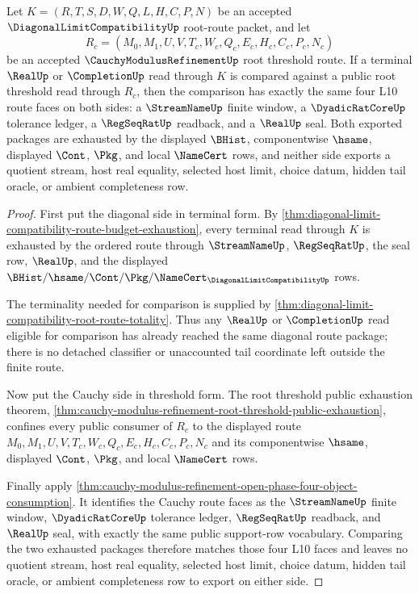 \begin{theorem}
\label{thm:diagonal-limit-compatibility-cauchy-refinement-threshold-correspondence}
Let $K=(R,T,S,D,W,Q,L,H,C,P,N)$ be an accepted $\DiagonalLimitCompatibilityUp$ root-route packet, and let
$$
R_c=(M_0,M_1,U,V,T_c,W_c,Q_c,E_c,H_c,C_c,P_c,N_c)
$$
be an accepted $\CauchyModulusRefinementUp$ root threshold route. If a terminal $\RealUp$ or $\CompletionUp$ read through $K$ is compared against a public root threshold read through $R_c$, then the comparison has exactly the same four L10 route faces on both sides: a $\StreamNameUp$ finite window, a $\DyadicRatCoreUp$ tolerance ledger, a $\RegSeqRatUp$ readback, and a $\RealUp$ seal. Both exported packages are exhausted by the displayed $\BHist$, componentwise $\hsame$, displayed $\Cont$, $\Pkg$, and local $\NameCert$ rows, and neither side exports a quotient stream, host real equality, selected host limit, choice datum, hidden tail oracle, or ambient completeness row.
\end{theorem}
\begin{proof}
First put the diagonal side in terminal form. By \autoref{thm:diagonal-limit-compatibility-route-budget-exhaustion}, every terminal read through $K$ is exhausted by the ordered route through $\StreamNameUp$, $\RegSeqRatUp$, the seal row, $\RealUp$, and the displayed $\BHist/\hsame/\Cont/\Pkg/\NameCert_{\DiagonalLimitCompatibilityUp}$ rows.

The terminality needed for comparison is supplied by \autoref{thm:diagonal-limit-compatibility-root-route-totality}. Thus any $\RealUp$ or $\CompletionUp$ read eligible for comparison has already reached the same diagonal route package; there is no detached classifier or unaccounted tail coordinate left outside the finite route.

Now put the Cauchy side in threshold form. The root threshold public exhaustion theorem, \autoref{thm:cauchy-modulus-refinement-root-threshold-public-exhaustion}, confines every public consumer of $R_c$ to the displayed route $M_0,M_1,U,V,T_c,W_c,Q_c,E_c,H_c,C_c,P_c,N_c$ and its componentwise $\hsame$, displayed $\Cont$, $\Pkg$, and local $\NameCert$ rows.

Finally apply \autoref{thm:cauchy-modulus-refinement-open-phase-four-object-consumption}. It identifies the Cauchy route faces as the $\StreamNameUp$ finite window, $\DyadicRatCoreUp$ tolerance ledger, $\RegSeqRatUp$ readback, and $\RealUp$ seal, with exactly the same public support-row vocabulary. Comparing the two exhausted packages therefore matches those four L10 faces and leaves no quotient stream, host real equality, selected host limit, choice datum, hidden tail oracle, or ambient completeness row to export on either side.
\end{proof}

